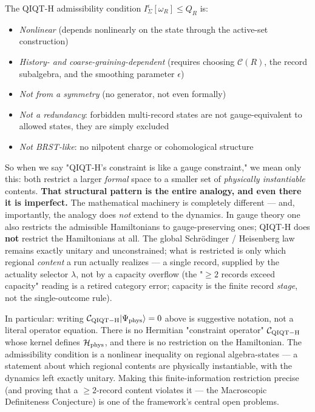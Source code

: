 \documentclass[11pt,a4paper]{article}
\begin{document}
The QIQT-H admissibility condition $I_\Sigma^\epsilon[\omega_R] \le Q_R$ is:

\begin{itemize}
  \item \emph{Nonlinear} (depends nonlinearly on the state through the active-set construction)
  \item \emph{History- and coarse-graining-dependent} (requires choosing $\mathcal{C}(R)$, the record subalgebra, and the smoothing parameter $\epsilon$)
  \item \emph{Not from a symmetry} (no generator, not even formally)
  \item \emph{Not a redundancy}: forbidden multi-record states are not gauge-equivalent to allowed states, they are simply excluded
  \item \emph{Not BRST-like}: no nilpotent charge or cohomological structure
\end{itemize}

So when we say "QIQT-H's constraint is like a gauge constraint," we mean only this: both restrict a larger \emph{formal} space to a smaller set of \emph{physically instantiable} contents. \textbf{That structural pattern is the entire analogy, and even there it is imperfect.} The mathematical machinery is completely different — and, importantly, the analogy does \emph{not} extend to the dynamics. In gauge theory one also restricts the admissible Hamiltonians to gauge-preserving ones; QIQT-H does \textbf{not} restrict the Hamiltonians at all. The global Schrödinger / Heisenberg law remains exactly unitary and unconstrained; what is restricted is only which regional \emph{content} a run actually realizes — a single record, supplied by the actuality selector $\lambda$, not by a capacity overflow (the "$\ge 2$ records exceed capacity" reading is a retired category error; capacity is the finite record \emph{stage}, not the single-outcome rule).

In particular: writing $\mathcal{C}_{\rm QIQT-H}|\Psi_{\rm phys}\rangle = 0$ above is suggestive notation, not a literal operator equation. There is no Hermitian "constraint operator" $\mathcal{C}_{\rm QIQT-H}$ whose kernel defines $\mathcal{H}_{\rm phys}$, and there is no restriction on the Hamiltonian. The admissibility condition is a nonlinear inequality on regional algebra-states — a statement about which regional contents are physically instantiable, with the dynamics left exactly unitary. Making this finite-information restriction precise (and proving that a $\ge 2$-record content violates it — the Macroscopic Definiteness Conjecture) is one of the framework's central open problems.
\end{document}
